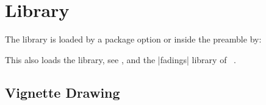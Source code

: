 \clearpage
\section{Library }\label{sec:vignette}%
%
The library is loaded by a package option or inside the preamble by:
\begin{dispListing}
\end{dispListing}
This also loads the  library, see ,
and the |fadings| library of \tikzname\ \cite{tantau:tikz_and_pgf}.


\subsection{Vignette Drawing}\label{subsec:vignettedrawing}

